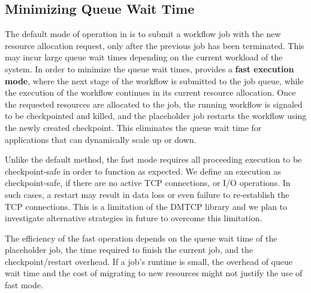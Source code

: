 \subsection{Minimizing Queue Wait Time}
\label{sec:fastmode}
The default mode of operation in \systemname is to submit a workflow job
with the new resource allocation request, only after the previous job has
been terminated. This may incur large queue wait times depending on the
current workload of the system. In order to minimize the queue wait times,
\systemname provides a \textbf{fast execution mode}, where the next stage
of the workflow is submitted to the job queue, while the execution of 
the workflow continues in its current resource allocation.
Once the requested resources are allocated
to the job, the running workflow is signaled to be checkpointed
and killed, and the placeholder job restarts the workflow using the newly
created checkpoint. This eliminates the queue wait time for
applications that can dynamically scale up or down.

Unlike the default \systemname method, the fast mode requires all proceeding 
execution to be checkpoint-safe in order to function as expected. We
define an execution as checkpoint-safe, if there are no active TCP
connections, or I/O operations.
In such cases, a restart may result in data loss or even 
failure to re-establish the TCP connections. 
This is a limitation of the DMTCP library and we plan to investigate alternative
strategies in future to overcome this limitation. 

The efficiency of the fast operation depends on the queue wait time of
the placeholder job, the time required to finish the current job, and
the checkpoint/restart overhead. If a job's runtime is small, the
overhead of queue wait time and the cost of migrating to new resources
might not justify the use of fast mode. 




